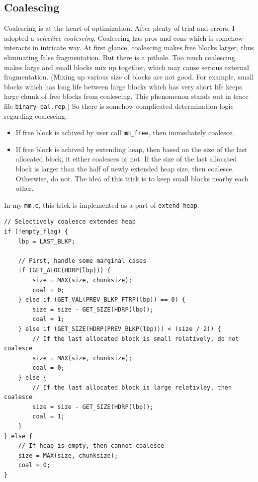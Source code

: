 \documentclass[fleqn]{article}
\begin{document}
\subsection{Coalescing}

Coalescing is at the heart of optimization. After plenty of trial and errors, I adopted a \textit{selective coalescing}. Coalescing has pros and cons which is somehow interacts in intricate way. At first glance, coalescing makes free blocks larger, thus eliminating false fragmentation. But there is a pithole. Too much coalescing makes large and small blocks mix up together, which may cause serious external fragmentation. (Mixing up various size of blocks are not good. For example, small blocks which has long life between large blocks which has very short life keeps large chunk of free blocks from coalescing. This phenomenon stands out in trace file \texttt{binary-bal.rep}.) So there is somehow complicated determination logic regarding coalescing.

\begin{itemize}
    \item If free block is achived by user call \texttt{mm\_free}, then immediately coalesce.
    \item If free block is achived by extending heap, then based on the size of the last allocated block, it either coalesces or not. If the size of the last allocated block is larger than the half of newly extended heap size, then coalesce. Otherwise, do not. The idea of this trick is to keep small blocks nearby each other.
\end{itemize}

In my \texttt{mm.c}, this trick is implemented as a part of \texttt{extend\_heap}.

\small
\begin{verbatim}
// Selectively coalesce extended heap
if (!empty_flag) {
    lbp = LAST_BLKP;
    
    // First, handle some marginal cases
    if (GET_ALOC(HDRP(lbp))) {
        size = MAX(size, chunksize);
        coal = 0;
    } else if (GET_VAL(PREV_BLKP_FTRP(lbp)) == 0) {
        size = size - GET_SIZE(HDRP(lbp));
        coal = 1;
    } else if (GET_SIZE(HDRP(PREV_BLKP(lbp))) < (size / 2)) {
        // If the last allocated block is small relatively, do not coalesce
        size = MAX(size, chunksize);
        coal = 0;
    } else {
        // If the last allocated block is large relativley, then coalesce
        size = size - GET_SIZE(HDRP(lbp));
        coal = 1;
    }
} else {
    // If heap is empty, then cannot coalesce
    size = MAX(size, chunksize);
    coal = 0;
}
\end{verbatim}
\normalsize
\end{document}
